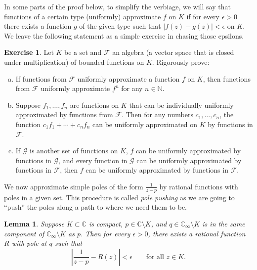\documentclass[12pt,openany]{book}
\newcommand{\sabs}[1]{\lvert {#1} \rvert}
\newcommand{\abs}[1]{\left\lvert {#1} \right\rvert}
\newcommand{\C}{{\mathbb{C}}}
\newcommand{\N}{{\mathbb{N}}}
\newcommand{\sF}{{\mathscr{F}}}
\newcommand{\sG}{{\mathscr{G}}}
\newcommand{\myindex}[1]{#1\index{#1}}
\newcommand{\myquote}[1]{``#1''}
\theoremstyle{plain}
\newtheorem{lemma}[thm]{Lemma}
\theoremstyle{remark}
\theoremstyle{definition}
\newenvironment{exbox}{%
    \def\FrameCommand{\vrule width 1pt \relax\hspace{10pt}}%
    \MakeFramed{\advance\hsize-\width\FrameRestore}%
}{%
    \endMakeFramed
}
\newenvironment{exparts}{%
    \leavevmode\begin{enumerate}[a),noitemsep,topsep=0pt,parsep=0pt,partopsep=0pt]
}{%
    \end{enumerate}
}
\theoremstyle{exercise}
\newtheorem{exercise}{Exercise}[section]
\theoremstyle{example}
\begin{document}
In some parts of the proof below, to simplify the verbiage, we will say that
functions of a certain type (uniformly) approximate $f$ on $K$
if for every $\epsilon > 0$ there exists a function $g$
of the given type such that
$\sabs{f(z)-g(z)} < \epsilon$ on $K$.  We leave the following statement as
a simple exercise in chasing those epsilons.

\begin{exbox}
\begin{exercise} \label{exercise:approxbyfamily}
Let $K$ be a set and $\sF$ an algebra (a vector space
that is closed under multiplication) of bounded functions on $K$.  Rigorously prove:
\begin{exparts}
\item
If functions from $\sF$ uniformly approximate a function $f$ on $K$,
then functions from $\sF$ uniformly approximate $f^n$ for any $n \in \N$.
\item
Suppose
$f_1,\ldots,f_n$ are functions on $K$ that can be individually
uniformly approximated
by functions from $\sF$.  Then for any numbers $c_1,\ldots,c_n$, the
function $c_1 f_1 + \cdots + c_n f_n$ can be uniformly approximated on $K$
by functions in $\sF$.
\item
If $\sG$ is another set of functions on $K$,
$f$ can be uniformly approximated by functions in $\sG$,
and every function in $\sG$ can be uniformly approximated by functions in
$\sF$, then $f$ can be uniformly approximated by functions in $\sF$.
\end{exparts}
\end{exercise}
\end{exbox}

We now approximate simple poles of the form $\frac{1}{z-p}$ by rational
functions with poles in a given set.  This procedure is called
\emph{\myindex{pole pushing}} as we are going to \myquote{push} the poles along a
path to where we need them to be.

\begin{lemma} \label{lemma:polepushing}
Suppose $K \subset \C$ is compact,
$p \in \C \setminus K$, and
$q \in \C_{\infty} \setminus K$ is
in the same component of $\C_{\infty} \setminus K$ as $p$.
Then for every $\epsilon > 0$,
there exists a rational function $R$ with pole at $q$ such that
\begin{equation*}
\abs{\frac{1}{z-p}-R(z)} < \epsilon \qquad \text{for all $z \in K$.}
\end{equation*}
\end{lemma}
\end{document}
